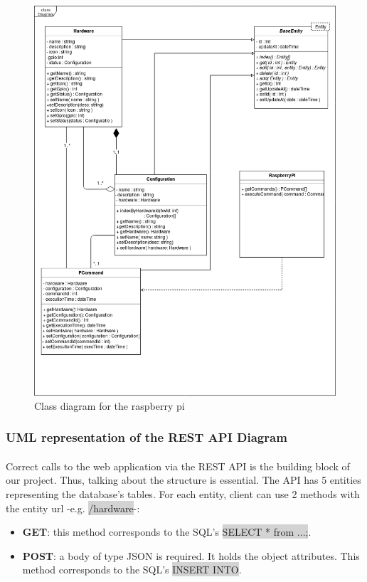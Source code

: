 \documentclass[12pt, oneside, a4paper]{book}
\newcommand{\code}[1]{{\color{red}\colorbox{lightgray}{#1}}}
\begin{document}
					\begin{figure}[H]
						\caption{Class diagram for the raspberry pi}
						\label{fig:class_rp}
						\includegraphics[width=\linewidth]{img/diagram_class2.png}
					\end{figure}
				\newpage\subsubsection{UML representation of the REST API Diagram}
				\paragraph{} Correct calls to the web application via the REST API is the building block of our project. Thus, talking about the structure is essential. The API has 5 entities representing the database's tables. For each entity, client can use 2 methods with the entity url -e.g. \code{/hardware}-: 
				\begin{itemize}
					\item \textbf{GET}: this method corresponds to the SQL's \code{SELECT * from ...;}.
					\item \textbf{POST}: a body of type JSON is required. It holds the object attributes. This method corresponds to the SQL's \code{INSERT INTO}.
				\end{itemize} 
\end{document}

